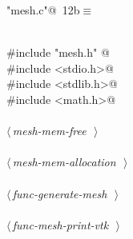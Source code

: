 \documentclass[a4paper,11pt]{article}
\begin{document}
\begin{flushleft} \small
\begin{minipage}{\linewidth}\label{scrap14}\raggedright\small
{} \verb@"mesh.c"@\nobreak\ {\footnotesize {12b}}$\equiv$
\vspace{-1ex}
\begin{list}{}{} \item
\mbox{}\verb@@\\
\mbox{}\verb@#include "mesh.h" @\\
\mbox{}\verb@#include <stdio.h>@\\
\mbox{}\verb@#include <stdlib.h>@\\
\mbox{}\verb@#include <math.h>@\\
\mbox{}\verb@@\\
\mbox{}\verb@@\hbox{$\langle\,${\itshape mesh-mem-free}\nobreak\ {\footnotesize {}}$\,\rangle$}\verb@@\\
\mbox{}\verb@@\\
\mbox{}\verb@@\hbox{$\langle\,${\itshape mesh-mem-allocation}\nobreak\ {\footnotesize {}}$\,\rangle$}\verb@@\\
\mbox{}\verb@@\\
\mbox{}\verb@@\hbox{$\langle\,${\itshape func-generate-mesh}\nobreak\ {\footnotesize {}}$\,\rangle$}\verb@@\\
\mbox{}\verb@@\\
\mbox{}\verb@@\hbox{$\langle\,${\itshape func-mesh-print-vtk}\nobreak\ {\footnotesize {}}$\,\rangle$}\verb@@\\
\mbox{}\verb@@{\NWsep}
\end{list}
\vspace{-1.5ex}
\footnotesize
\begin{list}{}{\setlength{\itemsep}{-\parsep}\setlength{\itemindent}{-\leftmargin}}

\item{}
\end{list}
\end{minipage}\vspace{4ex}
\end{flushleft}
\end{document}
